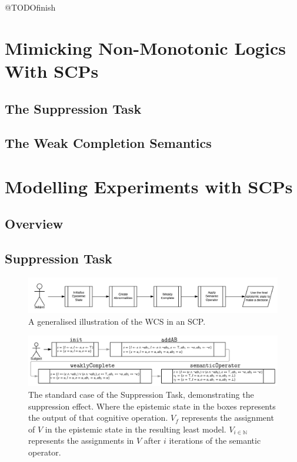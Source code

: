 \documentclass[
11pt, %
english, %
singlespacing, %
headsepline, %
]{MastersDoctoralThesis} %
\begin{document}
@TODOfinish

\chapter{Mimicking Non-Monotonic Logics With SCPs}

\section{The Suppression Task}

\section{The Weak Completion Semantics}



\chapter{Modelling Experiments with SCPs}
\section{Overview}
\section{Suppression Task}

\begin{figure}
\begin{center}
 \centering \includegraphics[width=\linewidth]{suppressionSCP_overview}
\caption{A generalised illustration of the WCS in an SCP. }
\label {fig:supoverview}
\end{center}
\end{figure}

\begin{figure}
\begin{center}
 \centering \includegraphics[width=\linewidth]{suppressionSCP_normal}
\caption{The standard case of the Suppression Task, demonstrating the suppression effect. Where the epistemic state in the boxes represents the output of that cognitive operation. $V_f$ represents the assignment of $V$ in the epistemic state in the resulting least model. $V_{i\in \mathbb{N}}$ represents the assignments in $V$ after $i$ iterations of the semantic operator.}
\label {fig:supnormal}
\end{center}
\end{figure}
\end{document}
